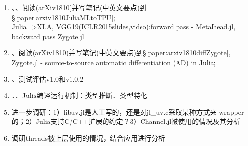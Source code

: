 \begin{enumerate}[T1.]
\item \CaiWT、\HeLY、\YuCD 阅读\cite{fischer2018juliaMLtoTPU}(\href{https://arxiv.org/abs/1810.09868}{arXiv1810})并写笔记(中英文要点)到\S\ref{paper:arxiv1810JuliaMLtoTPU};
    \\Julia=>XLA, \href{http://arxiv.org/abs/1409.1556}{VGG19}(ICLR2015\href{https://www.iclr.cc/archive/www/lib/exe/fetch.php%3Fmedia=iclr2015:simonyan-iclr2015.pdf}{slides},\href{https://youtu.be/OQe-9P51Z0s}{video}):forward pass - \href{https://github.com/FluxML/Metalhead.jl}{Metalhead.jl}, backward pass \href{https://github.com/FluxML/Zygote.jl}{Zygote.jl}
\item \DaiL、\HeJY 阅读\cite{innes2018diffZygote}(\href{https://arxiv.org/abs/1810.07951}{arXiv1810})并写笔记(中英文要点)到\S\ref{paper:arxiv1810diffZygote}, \href{https://github.com/FluxML/Zygote.jl}{Zygote.jl} - source-to-source automatic differentiation (AD) in Julia;
\item \HeLY、\YuCD 测试评估v1.0和v1.0.2
\item \CaiWT、\HeLY、\YuCD Julia编译运行机制：类型推断、类型特化
\item \HeJY 进一步调研：1）libuv.jl是人工写的，还是对jl\_uv.c采取某种方式来 wrapper的；2）Julia支持C/C++扩展的约定？3）Channel.jl被使用的情况及其分析
\item \ZhangLF 调研threads被上层使用的情况，结合应用进行分析
\end{enumerate}

